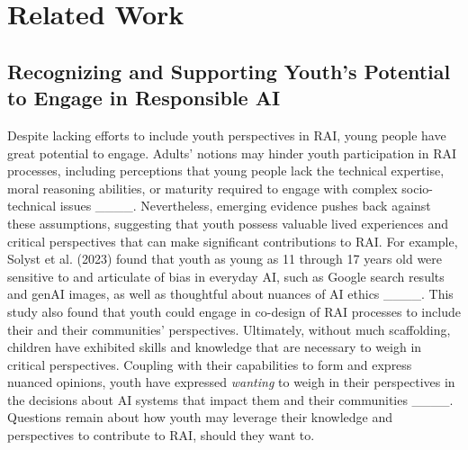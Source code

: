 \section{Related Work}

\subsection{Recognizing and Supporting Youth’s Potential to Engage in Responsible AI}
Despite lacking efforts to include youth perspectives in RAI, young people have great potential to engage. Adults’ notions may hinder youth participation in RAI processes, including perceptions that young people lack the technical expertise, moral reasoning abilities, or maturity required to engage with complex socio-technical issues ____. Nevertheless, emerging evidence pushes back against these assumptions, suggesting that youth possess valuable lived experiences and critical perspectives that can make significant contributions to RAI. For example, Solyst et al. (2023) found that youth as young as 11 through 17 years old were sensitive to and articulate of bias in everyday AI, such as Google search results and genAI images, as well as thoughtful about nuances of AI ethics ____. This study also found that youth could engage in co-design of RAI processes to include their and their communities’ perspectives. Ultimately, without much scaffolding, children have exhibited skills and knowledge that are necessary to weigh in critical perspectives. Coupling with their capabilities to form and express nuanced opinions, youth have expressed \emph{wanting} to weigh in their perspectives in the decisions about AI systems that impact them and their communities ____. Questions remain about how youth may leverage their knowledge and perspectives to contribute to RAI, should they want to.

